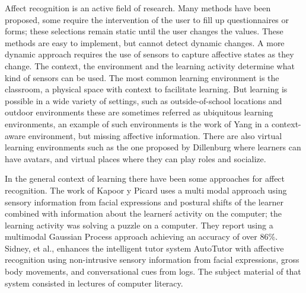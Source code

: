 \documentclass[a4paper,twoside]{article}
\begin{document}
Affect recognition is an active field of research. Many
methods have been proposed, some require the intervention of the user to fill up
questionnaires or forms; these selections remain static until the user changes
the values. These methods are easy to implement, but cannot detect dynamic
changes.  A more dynamic approach requires the use of sensors to capture
affective states as they change. The context, the environment and the learning
activity determine what kind of sensors can be used. The most common learning
environment is the classroom, a physical space with context to facilitate
learning. But learning is possible in a wide variety of settings, such as
outside-of-school locations and outdoor environments these are sometimes
referred as ubiquitous learning environments, an example of such environments is
the work of Yang \cite{yang2006context} in a context-aware environment, but missing affective
information. There are also virtual learning environments such as the one proposed by Dillenburg
\cite{dillenbourg2002virtual}  where learners can have avatars, and virtual places
where they can play roles and socialize.

In the general context of learning there have been some approaches for affect
recognition. The work of Kapoor y Picard \cite{kapoor2005multimodal} uses a multi modal
approach using sensory information from facial expressions and postural shifts
of the learner combined with information about the learner\'s activity on the
computer; the learning activity was solving a puzzle on a computer. They report
using a multimodal Gaussian Process approach achieving an accuracy of over 86\%.
Sidney, et al., \cite{sidney2005integrating} enhances the intelligent tutor system AutoTutor with
affective recognition using non-intrusive sensory information from facial
expressions, gross body movements, and conversational cues from logs.  The
subject material of that system consisted in lectures of computer
literacy.
\end{document}
